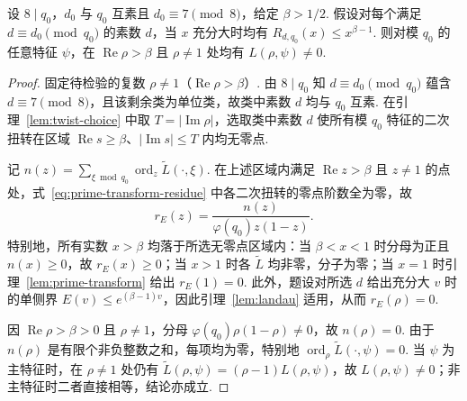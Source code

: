 \begin{theorem}
\label{thm:criterion}
\emitthmsource
设 $8\mid q_0$，$d_0$ 与 $q_0$ 互素且 $d_0\equiv7\pmod 8$，给定 $\beta>1/2$. 假设对每个满足 $d\equiv d_0\pmod{q_0}$ 的素数 $d$，当 $x$ 充分大时均有 $R_{d,q_0}(x)\le x^{\beta-1}$. 则对模 $q_0$ 的任意特征 $\psi$，在 $\operatorname{Re}\rho>\beta$ 且 $\rho\ne1$ 处均有 $L(\rho,\psi)\ne0$.
\end{theorem}
\begin{proof}
固定待检验的复数 $\rho\ne1$（$\operatorname{Re}\rho>\beta$）. 由 $8\mid q_0$ 知 $d\equiv d_0\pmod{q_0}$ 蕴含 $d\equiv7\pmod8$，且该剩余类为单位类，故类中素数 $d$ 均与 $q_0$ 互素. 在引理~\ref{lem:twist-choice} 中取 $T=|\operatorname{Im}\rho|$，选取类中素数 $d$ 使所有模 $q_0$ 特征的二次扭转在区域 $\operatorname{Re}s\ge\beta$、$|\operatorname{Im}s|\le T$ 内均无零点.

记 $n(z)=\sum_{\xi\bmod q_0}\operatorname{ord}_z\widetilde L(\cdot,\xi)$. 在上述区域内满足 $\operatorname{Re}z>\beta$ 且 $z\ne1$ 的点处，式~\eqref{eq:prime-transform-residue} 中各二次扭转的零点阶数全为零，故
\[
 r_E(z)=\frac{n(z)}{\varphi(q_0)z(1-z)}.
\]
特别地，所有实数 $x>\beta$ 均落于所选无零点区域内：当 $\beta<x<1$ 时分母为正且 $n(x)\ge0$，故 $r_E(x)\ge0$；当 $x>1$ 时各 $\widetilde L$ 均非零，分子为零；当 $x=1$ 时引理~\ref{lem:prime-transform} 给出 $r_E(1)=0$. 此外，题设对所选 $d$ 给出充分大 $v$ 时的单侧界 $E(v)\le e^{(\beta-1)v}$，因此引理~\ref{lem:landau} 适用，从而 $r_E(\rho)=0$.

因 $\operatorname{Re}\rho>\beta>0$ 且 $\rho\ne1$，分母 $\varphi(q_0)\rho(1-\rho)\ne0$，故 $n(\rho)=0$. 由于 $n(\rho)$ 是有限个非负整数之和，每项均为零，特别地 $\operatorname{ord}_\rho\widetilde L(\cdot,\psi)=0$. 当 $\psi$ 为主特征时，在 $\rho\ne1$ 处仍有 $\widetilde L(\rho,\psi)=(\rho-1)L(\rho,\psi)$，故 $L(\rho,\psi)\ne0$；非主特征时二者直接相等，结论亦成立.
\end{proof}

